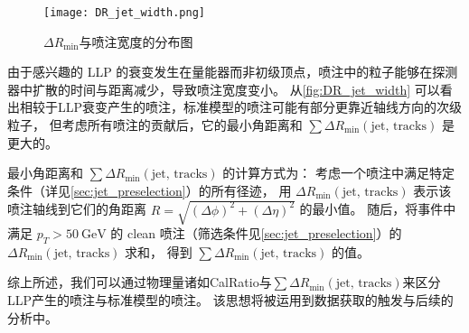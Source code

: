 \begin{figure}[ht]
    \centering
    \texttt{[image: DR\_jet\_width.png]}
    \caption{$\Delta R_{\min}$与喷注宽度的分布图\cite{ATLAS:2022zhj}}
    \label{fig:DR_jet_width}
\end{figure}

由于感兴趣的 LLP 的衰变发生在量能器而非初级顶点，喷注中的粒子能够在探测器中扩散的时间与距离减少，导致喷注宽度变小。
从\autoref{fig:DR_jet_width} 可以看出相较于LLP衰变产生的喷注，标准模型的喷注可能有部分更靠近轴线方向的次级粒子，
但考虑所有喷注的贡献后，它的最小角距离和 $\sum \Delta R_{\text{min}}(\text{jet, tracks})$ 是更大的。

最小角距离和 $\sum \Delta R_{\text{min}}(\text{jet, tracks})$ 的计算方式为：
考虑一个喷注中满足特定条件（详见\autoref{sec:jet_preselection}）的所有径迹，
用 $\Delta R_{\text{min}}(\text{jet, tracks})$ 表示该喷注轴线到它们的角距离
$R = \sqrt{(\Delta \phi)^2 + (\Delta \eta)^2}$ 的最小值。
随后，将事件中满足 \(p_T > 50~\text{GeV}\) 的 clean 喷注（筛选条件见\autoref{sec:jet_preselection}）的
\(\Delta R_{\text{min}}(\text{jet, tracks})\) 求和，
得到 \(\sum \Delta R_{\text{min}}(\text{jet, tracks})\) 的值。

综上所述，我们可以通过物理量诸如CalRatio与$\sum \Delta R_{\text{min}}(\text{jet, tracks})$来区分LLP产生的喷注与标准模型的喷注。
该思想将被运用到数据获取的触发与后续的分析中。
